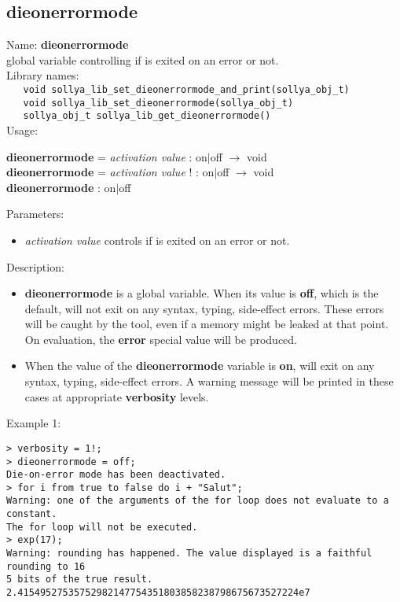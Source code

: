 \subsection{dieonerrormode}
\label{labdieonerrormode}
\noindent Name: \textbf{dieonerrormode}\\
\phantom{aaa}global variable controlling if \sollya is exited on an error or not.\\[0.2cm]
\noindent Library names:\\
\verb|   void sollya_lib_set_dieonerrormode_and_print(sollya_obj_t)|\\
\verb|   void sollya_lib_set_dieonerrormode(sollya_obj_t)|\\
\verb|   sollya_obj_t sollya_lib_get_dieonerrormode()|\\[0.2cm]
\noindent Usage: 
\begin{center}
\textbf{dieonerrormode} = \emph{activation value} : \textsf{on$|$off} $\rightarrow$ \textsf{void}\\
\textbf{dieonerrormode} = \emph{activation value} ! : \textsf{on$|$off} $\rightarrow$ \textsf{void}\\
\textbf{dieonerrormode} : \textsf{on$|$off}\\
\end{center}
Parameters: 
\begin{itemize}
\item \emph{activation value} controls if \sollya is exited on an error or not.
\end{itemize}
\noindent Description: \begin{itemize}

\item \textbf{dieonerrormode} is a global variable. When its value is \textbf{off}, which is the default,
   \sollya will not exit on any syntax, typing, side-effect errors. These
   errors will be caught by the tool, even if a memory might be leaked at 
   that point. On evaluation, the \textbf{error} special value will be produced.

\item When the value of the \textbf{dieonerrormode} variable is \textbf{on}, \sollya will exit
   on any syntax, typing, side-effect errors. A warning message will
   be printed in these cases at appropriate \textbf{verbosity} levels. 
\end{itemize}
\noindent Example 1: 
\begin{center}\begin{minipage}{15cm}\begin{Verbatim}[frame=single,commandchars=\\\|\~]
> verbosity = 1!;
> dieonerrormode = off;
Die-on-error mode has been deactivated.
> for i from true to false do i + "Salut";
Warning: one of the arguments of the for loop does not evaluate to a constant.
The for loop will not be executed.
> exp(17);
Warning: rounding has happened. The value displayed is a faithful rounding to 16
5 bits of the true result.
2.41549527535752982147754351803858238798675673527224e7
\end{Verbatim}
\end{minipage}\end{center}
